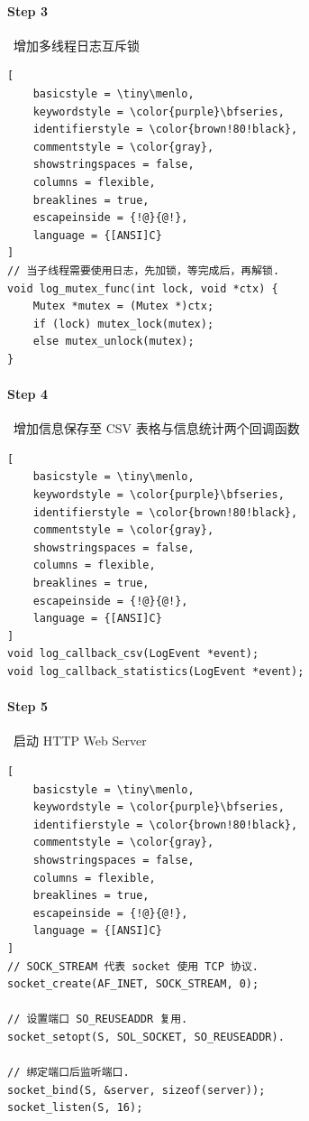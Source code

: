 \documentclass{article}
\begin{document}
\paragraph*{Step 3}~{增加多线程日志互斥锁}
\begin{lstlisting}[
    basicstyle = \tiny\menlo,
    keywordstyle = \color{purple}\bfseries,
    identifierstyle = \color{brown!80!black},
    commentstyle = \color{gray},
    showstringspaces = false,
    columns = flexible,
    breaklines = true,
    escapeinside = {!@}{@!},
    language = {[ANSI]C}
]
// 当子线程需要使用日志，先加锁，等完成后，再解锁.
void log_mutex_func(int lock, void *ctx) {
    Mutex *mutex = (Mutex *)ctx;
    if (lock) mutex_lock(mutex);
    else mutex_unlock(mutex);
}
\end{lstlisting}

\paragraph*{Step 4}~{增加信息保存至 CSV 表格与信息统计两个回调函数}
\begin{lstlisting}[
    basicstyle = \tiny\menlo,
    keywordstyle = \color{purple}\bfseries,
    identifierstyle = \color{brown!80!black},
    commentstyle = \color{gray},
    showstringspaces = false,
    columns = flexible,
    breaklines = true,
    escapeinside = {!@}{@!},
    language = {[ANSI]C}
]
void log_callback_csv(LogEvent *event);
void log_callback_statistics(LogEvent *event);
\end{lstlisting}

\paragraph*{Step 5}~{启动 HTTP Web Server}
\begin{lstlisting}[
    basicstyle = \tiny\menlo,
    keywordstyle = \color{purple}\bfseries,
    identifierstyle = \color{brown!80!black},
    commentstyle = \color{gray},
    showstringspaces = false,
    columns = flexible,
    breaklines = true,
    escapeinside = {!@}{@!},
    language = {[ANSI]C}
]
// SOCK_STREAM 代表 socket 使用 TCP 协议.
socket_create(AF_INET, SOCK_STREAM, 0);

// 设置端口 SO_REUSEADDR 复用.
socket_setopt(S, SOL_SOCKET, SO_REUSEADDR).

// 绑定端口后监听端口.
socket_bind(S, &server, sizeof(server));
socket_listen(S, 16);
\end{lstlisting}
\end{document}
